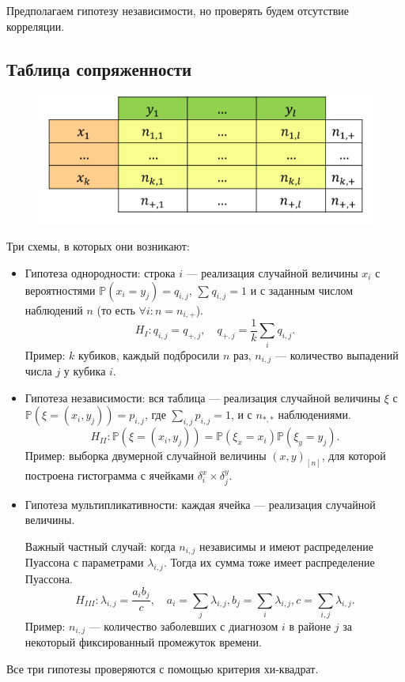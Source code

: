 \documentclass[11pt]{book}
\begin{document}
Предполагаем гипотезу независимости, но проверять будем отсутствие корреляции.

\subsection{Таблица сопряженности}
\begin{figure}
	\centering
    \includegraphics[scale=0.5]{./figures/table.png}
\end{figure}
Три схемы, в которых они возникают:
\begin{itemize}
	\item Гипотеза однородности: строка $i$ --- реализация случайной величины $x_i$ с вероятностями $\mathbb{P}(x_i = y_j) = q_{i, j}$, $\sum_{}^{} q_{i, j} = 1$ и с заданным числом наблюдений $n$ (то есть $ \forall i\colon n =  n_{i, +}$).
		\[
		H_{I}\colon q_{i, j} = q_{+, j}, \quad q_{+, j} = \frac{1}{k} \sum_{i}^{} q_{i, j}
		.\] 
		Пример: $k$ кубиков, каждый подбросили $n$ раз, $n_{i, j}$ --- количество выпадений числа $j$ у кубика $i$.
	\item Гипотеза независимости: вся таблица --- реализация случайной величины $\xi$ с 
		$\mathbb{P}\left(\xi = (x_i, y_j)\right) = p_{i, j}$,
		где $\sum_{i, j}^{} p_{i, j} = 1$, и с $n_{*, *}$ наблюдениями.
		\[
		H_{II}\colon \mathbb{P}\left(\xi = (x_i, y_j)\right) = \mathbb{P}(\xi_{x} = x_i) \mathbb{P}(\xi_{y} = y_j)
		.\] 
		Пример: выборка двумерной случайной величины $(x, y)_{[n]}$, для которой построена гистограмма с ячейками $\delta^{x}_i \times \delta^{y}_j$.
	\item Гипотеза мультипликативности: каждая ячейка --- реализация случайной величины.
		
		Важный частный случай: когда $n_{i, j}$ независимы и имеют распределение Пуассона с параметрами $\lambda_{i, j}$. Тогда их сумма тоже имеет распределение Пуассона.
		\[
		H_{III} \colon  \lambda_{i, j} = \frac{a_{i} b_{j}}{c}, \quad a_i = \sum_j \lambda_{i, j}, b_{j} = \sum_i \lambda_{i, j}, c = \sum_{i, j}^{} \lambda_{i, j}
		.\] 
		Пример: $n_{i, j}$ --- количество заболевших с диагнозом $i$ в районе $j$ за некоторый фиксированный промежуток времени.
\end{itemize}
Все три гипотезы проверяются с помощью критерия хи-квадрат.
\end{document}
